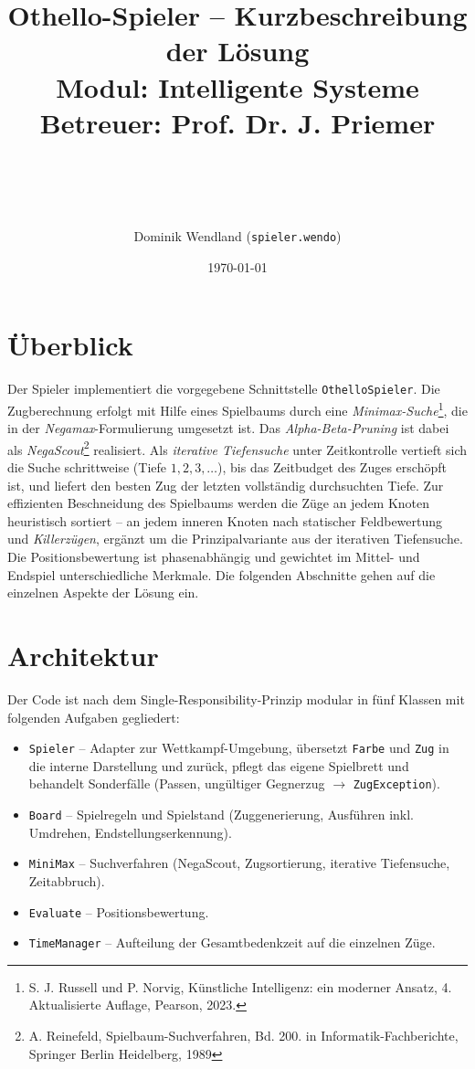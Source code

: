 \documentclass[11pt,a4paper, top=1cm]{article}
\title{\vspace{-2.4em}Othello-Spieler – Kurzbeschreibung der Lösung\\
\vspace{0.2cm} \large Modul: Intelligente Systeme
\\\vspace{0.2cm} \small Betreuer: Prof. Dr. J. Priemer\\
\author{\large Dominik Wendland (\texttt{spieler.wendo})}\\
\date{\today}}
\begin{document}
\maketitle
\vspace{-2em}

\section{Überblick}
Der Spieler implementiert die vorgegebene Schnittstelle \texttt{OthelloSpieler}.
Die Zugberechnung erfolgt mit Hilfe eines Spielbaums durch eine
\textit{Minimax-Suche}\footnote{S. J. Russell und P. Norvig, Künstliche Intelligenz: ein moderner Ansatz, 4. Aktualisierte Auflage, Pearson, 2023.},
die in der \textit{Negamax}-Formulierung umgesetzt ist.
Das \textit{Alpha-Beta-Pruning} ist dabei als
\textit{NegaScout}\footnote{A. Reinefeld, Spielbaum-Suchverfahren, Bd. 200. in Informatik-Fachberichte, Springer Berlin Heidelberg, 1989} realisiert.
Als \textit{iterative Tiefensuche} unter Zeitkontrolle vertieft sich die Suche
schrittweise (Tiefe $1, 2, 3, \dots$), bis das Zeitbudget des Zuges erschöpft ist,
und liefert den besten Zug der letzten vollständig durchsuchten Tiefe.
Zur effizienten Beschneidung des Spielbaums werden die Züge an jedem Knoten heuristisch
sortiert -- an
jedem inneren Knoten nach statischer Feldbewertung und \textit{Killerzügen}, ergänzt um die
Prinzipalvariante aus der iterativen Tiefensuche.
Die Positionsbewertung ist phasenabhängig und gewichtet im Mittel- und Endspiel
unterschiedliche Merkmale.
Die folgenden Abschnitte gehen auf die einzelnen Aspekte der Lösung ein.


\section{Architektur}
Der Code ist nach dem Single-Responsibility-Prinzip modular in fünf Klassen mit
folgenden Aufgaben gegliedert:
\begin{itemize}
\item \texttt{Spieler} -- Adapter zur Wettkampf-Umgebung, übersetzt \texttt{Farbe} und
\texttt{Zug} in die interne Darstellung und zurück, pflegt das eigene Spielbrett und
behandelt Sonderfälle (Passen, ungültiger Gegnerzug $\to$ \texttt{ZugException}).
\item \texttt{Board} -- Spielregeln und Spielstand (Zuggenerierung, Ausführen inkl.
Umdrehen, Endstellungserkennung).
\item \texttt{MiniMax} -- Suchverfahren (NegaScout, Zugsortierung, iterative Tiefensuche,
Zeitabbruch).
\item \texttt{Evaluate} -- Positionsbewertung.
\item \texttt{TimeManager} -- Aufteilung der Gesamtbedenkzeit auf die einzelnen Züge.
\end{itemize}
\end{document}
